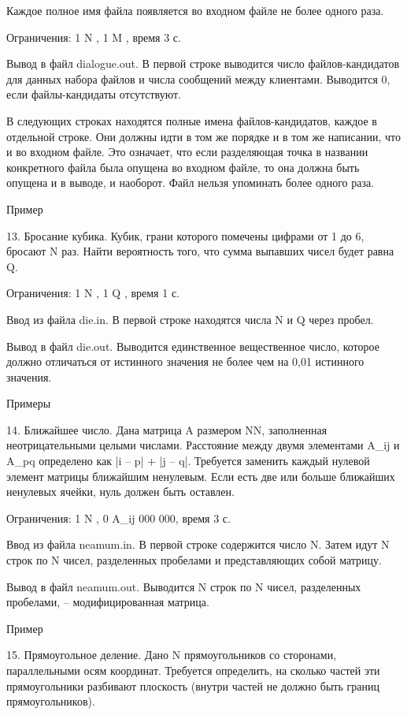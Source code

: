 \documentclass[]{article}
\begin{document}
Каждое полное имя файла появляется во входном файле не более одного раза.

Ограничения: 1 \leq N , 1 \leq M , время 3 с.

Вывод в файл dialogue.out. В первой строке выводится число файлов-кандидатов для данных набора файлов и числа сообщений между клиентами. Выводится 0, если файлы-кандидаты отсутствуют.

В следующих строках находятся полные имена файлов-кандидатов, каждое в отдельной строке. Они должны идти в том же порядке и в том же написании, что и во входном файле. Это означает, что если разделяющая точка в названии конкретного файла была опущена во входном файле, то она должна быть опущена и в выводе, и наоборот. Файл нельзя упоминать более одного раза.

Пример



	13. Бросание кубика. Кубик, грани которого помечены цифрами от 1 до 6, бросают N раз. Найти вероятность того, что сумма выпавших чисел будет равна Q.

Ограничения: 1 \leq N , 1 \leq Q , время 1 с.

Ввод из файла die.in. В первой строке находятся числа N и Q через пробел.

Вывод в файл die.out. Выводится единственное вещественное число, которое должно отличаться от истинного значения не более чем на 0,01 истинного значения.

Примеры



14. Ближайшее число. Дана матрица A размером N\times N, заполненная неотрицательными целыми числами. Расстояние между двумя элементами A_{ij} и A_{pq} определено как |i – p| + |j – q|. Требуется заменить каждый нулевой элемент матрицы ближайшим ненулевым. Если есть две или больше ближайших ненулевых ячейки, нуль должен быть оставлен.

Ограничения: 1 \leq N , 0 \leq A_{ij}  000 000, время 3 с.

Ввод из файла neamum.in. В первой строке содержится число N. Затем идут N строк по N чисел, разделенных пробелами и представляющих собой матрицу.

Вывод в файл neamum.out. Выводится N строк по N чисел, разделенных пробелами, – модифицированная матрица.

Пример



15. Прямоугольное деление. Дано N прямоугольников со сторонами, параллельными осям координат. Требуется определить, на сколько частей эти прямоугольники разбивают плоскость (внутри частей не должно быть границ прямоугольников).
\end{document}
